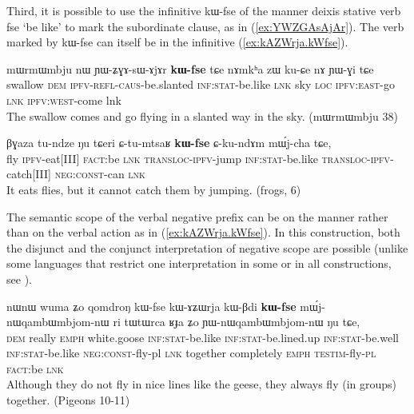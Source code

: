 \documentclass[oldfontcommands,oneside,a4paper,11pt]{article}
\newcommand{\ipa}[1]{{\phon \mbox{#1}}} %
\newcommand{\refb}[1]{(\ref{#1})}
\begin{document}
 

Third, it is possible to use the infinitive   \ipa{kɯ-fse} of the manner deixis stative verb \ipa{fse} `be like' to mark the subordinate clause, as in \refb{ex:YWZGAsAjAr}. The verb  marked by   \ipa{kɯ-fse} can itself be in the infinitive \refb{ex:kAZWrja.kWfse}.

\begin{exe}
\ex \label{ex:YWZGAsAjAr}
\gll
 	\ipa{mɯrmɯmbju} 	\ipa{nɯ} 	\ipa{ɲɯ-ʑɣɤ-sɯ-ɤjɤr} 	\ipa{\textbf{kɯ-fse}} 	\ipa{tɕe} 	\ipa{nɤmkʰa} 	\ipa{zɯ} 	\ipa{ku-ɕe} 	\ipa{nɤ} 	\ipa{ɲɯ-ɣi} 	\ipa{tɕe} 	\\
 	swallow \textsc{dem} \textsc{ipfv-refl-caus}-be.slanted \textsc{inf:stat}-be.like \textsc{lnk} sky \textsc{loc}  \textsc{ipfv:east}-go \textsc{lnk} \textsc{ipfv:west}-come lnk \\
\glt The swallow comes and go flying in a slanted way in the sky. (mɯrmɯmbju 38)
\end{exe}

\begin{exe}
\ex \label{ex:YWZGAsAjAr}
\gll
\ipa{βɣaza}         	\ipa{tu-ndze}         	\ipa{ŋu}         	\ipa{tɕeri}         	\ipa{ɕ-tu-mtsaʁ}         	\ipa{\textbf{kɯ-fse}}         	\ipa{ɕ-ku-ndɤm}         	\ipa{mɯ́j-cha}         	\ipa{tɕe,}         \\
fly \textsc{ipfv}-eat[III] \textsc{fact}:be \textsc{lnk} \textsc{transloc-ipfv}-jump  \textsc{inf:stat}-be.like  \textsc{transloc-ipfv}-catch[III] \textsc{neg:const}-can \textsc{lnk} \\
\glt It eats flies, but it cannot catch them by jumping. (frogs, 6)
\end{exe}

The semantic scope of the verbal negative prefix can be on the manner rather than on the verbal action as in \refb{ex:kAZWrja.kWfse}.  In this construction, both the disjunct and the conjunct interpretation of negative scope are possible (unlike some languages that restrict one interpretation in some or in all constructions, see \citealt[61]{bickel10linking}).

\begin{exe}
\ex \label{ex:kAZWrja.kWfse}
\gll
\ipa{nɯnɯ} 	\ipa{wuma} 	\ipa{ʑo} 	\ipa{qomdroŋ} 	\ipa{kɯ-fse} 	\ipa{kɯ-ɤʑɯrja} 	\ipa{kɯ-βdi} 	\ipa{\textbf{kɯ-fse}} 	\ipa{mɯ́j-nɯqambɯmbjom-nɯ} 	\ipa{ri} \ipa{tɯtɯrca} 	\ipa{ʁɟa} 	\ipa{ʑo} 	\ipa{ɲɯ-nɯqambɯmbjom-nɯ} 	\ipa{ŋu} 	\ipa{tɕe,} 
\\
\textsc{dem} really \textsc{emph} white.goose  \textsc{inf:stat}-be.like  \textsc{inf:stat}-be.lined.up   \textsc{inf:stat}-be.well \textsc{inf:stat}-be.like \textsc{neg:const}-fly-pl \textsc{lnk} together completely \textsc{emph} \textsc{testim}-fly-\textsc{pl} \textsc{fact}:be \textsc{lnk} \\
\glt Although they do not fly in nice lines like the geese, they always fly (in groups) together. (Pigeons 10-11)
\end{exe}
 
\end{document}

